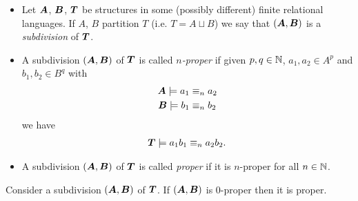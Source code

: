 \documentclass{amsart}
\DeclareMathOperator{\TT}{\boldface T}
\DeclareMathOperator{\A}{\boldface A}
\DeclareMathOperator{\B}{\boldface B}
\begin{document}
\begin{Definition}
  \begin{itemize}
  \item Let $\A$, $\B$, $\TT$ be structures in some (possibly different) finite relational languages. If $A$, $B$ partition $T$ (i.e. $T = A \sqcup B$) we say that $(\A, \B)$ is a \emph{subdivision} of $\TT$.
  \item A subdivision $(\A, \B)$ of $\TT$ is called \emph{$n$-proper} if given $p,q \in \mathbb{N}$,  $a_1, a_2 \in A^p$ and $b_1, b_2 \in B^q$ with
    \begin{align*}
      \A \models a_1 &\equiv_n a_2 \\
      \B \models b_1 &\equiv_n b_2
    \end{align*}
    we have
    \begin{align*}
      \TT \models a_1b_1 \equiv_n a_2b_2.
    \end{align*}
  \item A subdivision $(\A, \B)$ of $\TT$ is called \emph{proper} if it is $n$-proper for all $n \in \mathbb{N}$.
  \end{itemize}
\end{Definition}

\begin{Lemma} \label{lm_subdivision}
	Consider a subdivision $(\A, \B)$ of $\TT$. If $(\A, \B)$ is $0$-proper then it is proper.
\end{Lemma}
\end{document}
